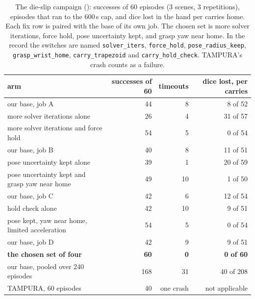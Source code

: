 \begin{table}[tbp]
\centering
\small
\begin{tabular}{@{}lrrr@{}}
\toprule
arm & successes of 60 & timeouts & dice lost, per carries \\
\midrule
our base, job A                                 & 44 & 8  & 8 of 52 \\
more solver iterations alone                    & 26 & 4  & 31 of 57 \\
more solver iterations and force hold           & 54 & 5  & 0 of 54 \\
our base, job B                                 & 40 & 8  & 11 of 51 \\
pose uncertainty kept alone                     & 39 & 1  & 20 of 59 \\
pose uncertainty kept and grasp yaw near home   & 49 & 10 & 1 of 50 \\
our base, job C                                 & 42 & 6  & 12 of 54 \\
hold check alone                                & 42 & 10 & 9 of 51 \\
pose kept, yaw near home, limited acceleration  & 54 & 5  & 0 of 54 \\
our base, job D                                 & 42 & 9  & 9 of 51 \\
\textbf{the chosen set of four}                 & \textbf{60} & \textbf{0} & \textbf{0 of 60} \\
\midrule
our base, pooled over 240 episodes              & 168 & 31 & 40 of 208 \\
TAMPURA, 60 episodes                            & 40  & one crash & not applicable \\
\bottomrule
\end{tabular}
\caption[The die-slip campaign: successes of 60 episodes, timeouts, and dice lost
per carries.]{The die-slip campaign (): successes of 60 episodes (3 scenes, 3
repetitions), episodes that ran to the 600\,s cap, and dice lost in the hand per
carries home. Each fix row is paired with the base of its own job. The chosen set
is more solver iterations, force hold, pose uncertainty kept, and grasp yaw near
home. In the record the switches are named \texttt{solver\_iters},
\texttt{force\_hold}, \texttt{pose\_radius\_keep}, \texttt{grasp\_wrist\_home},
\texttt{carry\_trapezoid} and \texttt{carry\_hold\_check}. TAMPURA's crash counts as
a failure. }
\label{tab:slip}
\end{table}

